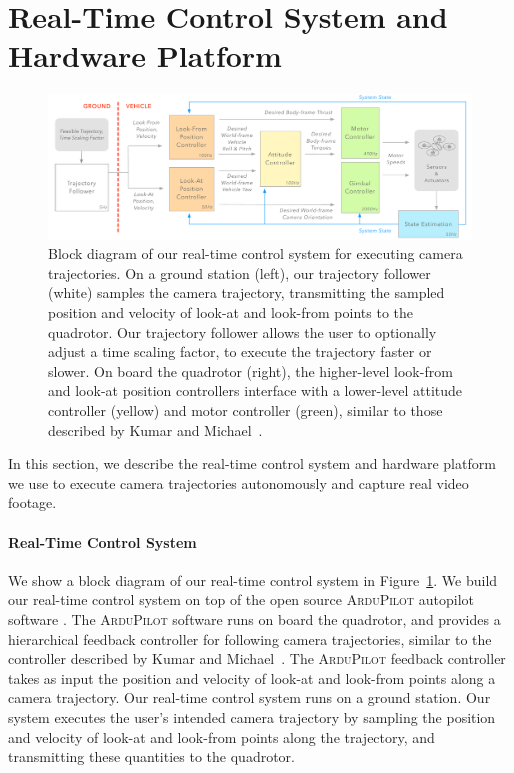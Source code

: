 \section{Real-Time Control System and Hardware Platform}
\label{sec:ch2:hw}

\begin{figure}[t]
\centering
\includegraphics[width=6.0in]{images/2015_siggraph_asia/ControlAlgorithm}
\caption{
Block diagram of our real-time control system for executing camera trajectories.
On a ground station (left), our trajectory follower (white) samples the camera trajectory, transmitting the sampled position and velocity of look-at and look-from points to the quadrotor.
Our trajectory follower allows the user to optionally adjust a time scaling factor, to execute the trajectory faster or slower.
On board the quadrotor (right), the higher-level look-from and look-at position controllers interface with a lower-level attitude controller (yellow) and motor controller (green), similar to those described by Kumar and Michael~\protect{}.
}
\label{fig:ch2:controlsystem}
\end{figure}

In this section, we describe the real-time control system and hardware platform we use to execute camera trajectories autonomously and capture real video footage.

\paragraph{Real-Time Control System}
We show a block diagram of our real-time control system in Figure~\ref{fig:ch2:controlsystem}.
We build our real-time control system on top of the open source \textsc{ArduPilot} autopilot software \cite{apm:2015}. 
The \textsc{ArduPilot} software runs on board the quadrotor, and provides a hierarchical feedback controller for following camera trajectories, similar to the controller described by Kumar and Michael~. 
The \textsc{ArduPilot} feedback controller takes as input the position and velocity of look-at and look-from points along a camera trajectory.
Our real-time control system runs on a ground station.
Our system executes the user's intended camera trajectory by sampling the position and velocity of look-at and look-from points along the trajectory, and transmitting these quantities to the quadrotor.

